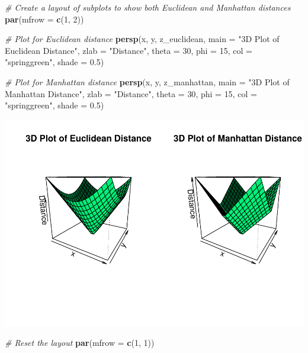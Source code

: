 \documentclass[
]{article}
\newenvironment{Shaded}{\begin{snugshade}}{\end{snugshade}}
\newcommand{\AttributeTok}[1]{\textcolor[rgb]{0.13,0.29,0.53}{#1}}
\newcommand{\CommentTok}[1]{\textcolor[rgb]{0.56,0.35,0.01}{\textit{#1}}}
\newcommand{\DecValTok}[1]{\textcolor[rgb]{0.00,0.00,0.81}{#1}}
\newcommand{\FloatTok}[1]{\textcolor[rgb]{0.00,0.00,0.81}{#1}}
\newcommand{\FunctionTok}[1]{\textcolor[rgb]{0.13,0.29,0.53}{\textbf{#1}}}
\newcommand{\NormalTok}[1]{#1}
\newcommand{\StringTok}[1]{\textcolor[rgb]{0.31,0.60,0.02}{#1}}
\begin{document}
\begin{Shaded}
\begin{Highlighting}[]
\CommentTok{\# Create a layout of subplots to show both Euclidean and Manhattan distances}
\FunctionTok{par}\NormalTok{(}\AttributeTok{mfrow =} \FunctionTok{c}\NormalTok{(}\DecValTok{1}\NormalTok{, }\DecValTok{2}\NormalTok{))}

\CommentTok{\# Plot for Euclidean distance}
\FunctionTok{persp}\NormalTok{(x, y, z\_euclidean,}
      \AttributeTok{main =} \StringTok{"3D Plot of Euclidean Distance"}\NormalTok{,}
      \AttributeTok{zlab =} \StringTok{"Distance"}\NormalTok{,}
      \AttributeTok{theta =} \DecValTok{30}\NormalTok{, }\AttributeTok{phi =} \DecValTok{15}\NormalTok{,}
      \AttributeTok{col =} \StringTok{"springgreen"}\NormalTok{, }\AttributeTok{shade =} \FloatTok{0.5}\NormalTok{)}

\CommentTok{\# Plot for Manhattan distance}
\FunctionTok{persp}\NormalTok{(x, y, z\_manhattan,}
      \AttributeTok{main =} \StringTok{"3D Plot of Manhattan Distance"}\NormalTok{,}
      \AttributeTok{zlab =} \StringTok{"Distance"}\NormalTok{,}
      \AttributeTok{theta =} \DecValTok{30}\NormalTok{, }\AttributeTok{phi =} \DecValTok{15}\NormalTok{,}
      \AttributeTok{col =} \StringTok{"springgreen"}\NormalTok{, }\AttributeTok{shade =} \FloatTok{0.5}\NormalTok{)}
\end{Highlighting}
\end{Shaded}

\includegraphics{week1_files/figure-latex/unnamed-chunk-3-1.pdf}

\begin{Shaded}
\begin{Highlighting}[]
\CommentTok{\# Reset the layout}
\FunctionTok{par}\NormalTok{(}\AttributeTok{mfrow =} \FunctionTok{c}\NormalTok{(}\DecValTok{1}\NormalTok{, }\DecValTok{1}\NormalTok{))}
\end{Highlighting}
\end{Shaded}
\end{document}
